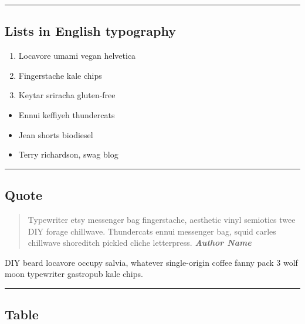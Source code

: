 \documentclass[]{article}
\begin{document}
\begin{center}\rule{3in}{0.4pt}\end{center}

\subsection{Lists in English
typography}\label{lists-in-english-typography-1}

\begin{enumerate}
\def\labelenumi{\arabic{enumi}.}
\itemsep1pt\parskip0pt
\item
  Locavore umami vegan helvetica
\item
  Fingerstache kale chips
\item
  Keytar sriracha gluten-free
\end{enumerate}

\begin{itemize}
\itemsep1pt\parskip0pt
\item
  Ennui keffiyeh thundercats
\item
  Jean shorts biodiesel
\item
  Terry richardson, swag blog
\end{itemize}

\begin{center}\rule{3in}{0.4pt}\end{center}

\subsection{Quote}\label{quote}

\begin{quote}
Typewriter etsy messenger bag fingerstache, aesthetic vinyl semiotics
twee DIY forage chillwave. Thundercats ennui messenger bag, squid carles
chillwave shoreditch pickled cliche letterpress. \emph{\textbf{Author
Name}}
\end{quote}

DIY beard locavore occupy salvia, whatever single-origin coffee fanny
pack 3 wolf moon typewriter gastropub kale chips.

\begin{center}\rule{3in}{0.4pt}\end{center}

\subsection{Table}\label{table}
\end{document}

